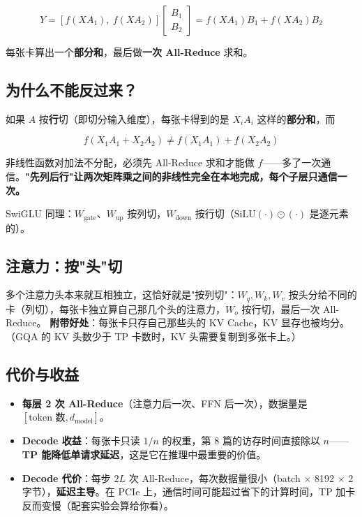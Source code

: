 \[
Y = [f(XA_1), \ f(XA_2)] \begin{bmatrix} B_1 \\ B_2 \end{bmatrix} = f(XA_1) B_1 + f(XA_2) B_2
\]

每张卡算出一个\textbf{部分和}，最后做\textbf{一次 All-Reduce} 求和。

\subsection{为什么不能反过来？}

如果 $A$ 按\textbf{行}切（即切分输入维度），每张卡得到的是 $X_i A_i$ 这样的\textbf{部分和}，而

\[
f(X_1 A_1 + X_2 A_2) \neq f(X_1 A_1) + f(X_2 A_2)
\]

非线性函数对加法不分配，必须先 All-Reduce 求和才能做 $f$——多了一次通信。\textbf{"先列后行"让两次矩阵乘之间的非线性完全在本地完成，每个子层只通信一次。}

SwiGLU 同理：$W_{\text{gate}}$、$W_{\text{up}}$ 按列切，$W_{\text{down}}$ 按行切（$\text{SiLU}(\cdot) \odot (\cdot)$ 是逐元素的）。

\subsection{注意力：按"头"切}

多个注意力头本来就互相独立，这恰好就是"按列切"：$W_q, W_k, W_v$ 按头分给不同的卡（列切），每张卡独立算自己那几个头的注意力，$W_o$ 按行切，最后一次 All-Reduce。
\textbf{附带好处}：每张卡只存自己那些头的 KV Cache，KV 显存也被均分。（GQA 的 KV 头数少于 TP 卡数时，KV 头需要复制到多张卡上。）

\subsection{代价与收益}

\begin{itemize}
  \item \textbf{每层 2 次 All-Reduce}（注意力后一次、FFN 后一次），数据量是 $[\text{token 数}, d_{\text{model}}]$。
  \item \textbf{Decode 收益}：每张卡只读 $1/n$ 的权重，第 8 篇的访存时间直接除以 $n$——\textbf{TP 能降低单请求延迟}，这是它在推理中最重要的价值。
  \item \textbf{Decode 代价}：每步 $2L$ 次 All-Reduce，每次数据量很小（batch $\times$ 8192 $\times$ 2 字节），\textbf{延迟主导}。在 PCIe 上，通信时间可能超过省下的计算时间，TP 加卡反而变慢（配套实验会算给你看）。
\end{itemize}

